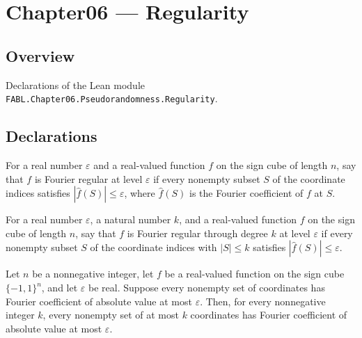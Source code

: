 \chapter{Chapter06 — Regularity}
\section{Overview}

Declarations of the Lean module \texttt{FABL.Chapter06.Pseudorandomness.Regularity}.

\section{Declarations}

\begin{definition}
\label{FABL.IsFourierRegular}
\leanok
{}
For a real number $\varepsilon$ and a real-valued function $f$ on the sign cube of
length $n$, say that $f$ is Fourier regular at level $\varepsilon$ if every nonempty
subset $S$ of the coordinate indices satisfies $|\widehat f(S)|\le\varepsilon$, where
$\widehat f(S)$ is the Fourier coefficient of $f$ at $S$.
\end{definition}

\begin{definition}
\label{FABL.IsLowDegreeFourierRegular}
\leanok
{}
For a real number $\varepsilon$, a natural number $k$, and a real-valued function $f$ on
the sign cube of length $n$, say that $f$ is Fourier regular through degree $k$ at level
$\varepsilon$ if every nonempty subset $S$ of the coordinate indices with $|S|\le k$
satisfies $|\widehat f(S)|\le\varepsilon$.
\end{definition}

\begin{theorem}
\label{FABL.IsFourierRegular.isLowDegreeFourierRegular}
\leanok
{}
Let $n$ be a nonnegative integer, let $f$ be a real-valued function on the sign cube
$\{−1,1\}^n$, and let $\varepsilon$ be real. Suppose every nonempty set of
coordinates has Fourier coefficient of absolute value at most $\varepsilon$. Then, for
every nonnegative integer $k$, every nonempty set of at most $k$ coordinates has Fourier
coefficient of absolute value at most $\varepsilon$.
\end{theorem}

